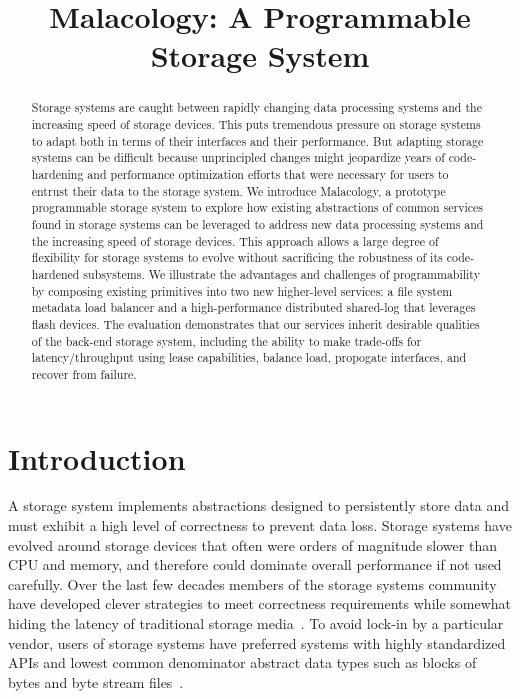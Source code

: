 \documentclass[preprint]{sigplanconf-eurosys}
\title{Malacology: A Programmable Storage System}
\date{}
\begin{document}
\maketitle

\begin{abstract}
Storage systems are caught between rapidly changing data
processing systems and the increasing speed of storage devices. This puts
tremendous pressure on storage systems to adapt both in terms of their
interfaces and their performance. But adapting storage systems can be difficult
because unprincipled changes might jeopardize years of code-hardening and
performance optimization efforts that were necessary for users to entrust their
data to the storage system.  We introduce  Malacology, a prototype programmable
storage system to explore how existing abstractions of common services found in
storage systems can be leveraged to address new data processing systems and the
increasing speed of storage devices. This approach allows a large degree of
flexibility for storage systems to evolve without sacrificing the robustness of
its code-hardened subsystems.  We illustrate the advantages and challenges of
programmability by composing existing primitives into two new higher-level
services: a file system metadata load balancer and a high-performance distributed
shared-log that leverages flash devices. The evaluation demonstrates that our
services inherit desirable qualities of the back-end storage system, including
the ability to make trade-offs for latency/throughput using lease capabilities, balance load, propogate
interfaces, and recover from failure.
\end{abstract}

\section{Introduction}
\label{introduction}
\label{sec:intro}

A storage system implements abstractions designed to persistently store data
and must exhibit a high level of correctness to prevent data loss.  Storage
systems have evolved around storage devices that often were orders of magnitude
slower than CPU and memory, and therefore could dominate overall performance if
not used carefully. Over the last few decades members of the storage systems
community have developed clever strategies to meet correctness requirements
while somewhat hiding the latency of traditional storage
media~\cite{brewer_disks_2016}. To avoid lock-in by a particular vendor, users
of storage systems have preferred systems with highly standardized APIs and
lowest common denominator abstract data types such as blocks of bytes and byte
stream files~\cite{armbrust_view_2010}.
\end{document}
